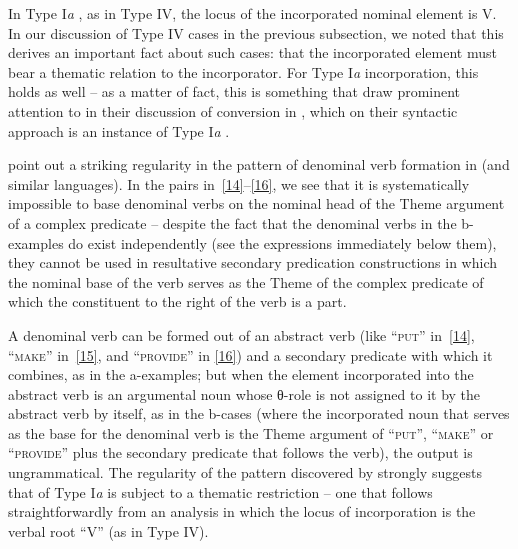 \documentclass[output=paper]{langsci/langscibook}
\begin{document}
\begin{refcontext}
In Type I\emph{a} , as in Type IV, the locus of the
incorporated nominal element is V. In our discussion of Type IV cases in the
previous subsection, we noted that this derives an important fact about such
cases: that the incorporated element must bear a thematic relation to the
incorporator. For Type I\emph{a} incorporation, this holds as well -- as a
matter of fact, this is something that \cite{halekeyser} draw prominent
attention to in their discussion of conversion in , which on their
syntactic approach is an instance of Type I\emph{a} .

\cite{halekeyser} point out a striking regularity in the pattern of denominal
verb formation in  (and similar languages). In the pairs
in~\eqref{14}--\eqref{16}, we see that it is systematically impossible to base
denominal verbs on the nominal head of the Theme argument of a complex
predicate -- despite the fact that the denominal verbs in the b-examples do
exist independently (see the expressions immediately below them), they cannot
be used in resultative secondary predication constructions in which the nominal
base of the verb serves as the Theme of the complex predicate of which the
constituent to the right of the verb is a part.

\ea \label{14}
    \z
\z

\ea \label{15}
    \z
\z

\ea \label{16}
    \z
\z
A denominal verb can be formed out of an abstract verb (like
\enquote{\textsc{put}} in~\eqref{14}, \enquote{\textsc{make}} in~\eqref{15},
and \enquote{\textsc{provide}} in \eqref{16}) and a secondary predicate with
which it combines, as in the a-examples; but when the element incorporated into
the abstract verb is an argumental noun whose θ{}-role is not assigned to it by
the abstract verb by itself, as in the b-cases (where the incorporated noun
that serves as the base for the denominal verb is the Theme argument of
\enquote{\textsc{put}}, \enquote{\textsc{make}} or \enquote{\textsc{provide}}
plus the secondary predicate that follows the verb), the output is
ungrammatical. The regularity of the pattern discovered by \cite{halekeyser}
strongly suggests that  of Type I\emph{a} is subject to a
thematic restriction -- one that follows straightforwardly from an analysis in
which the locus of incorporation is the verbal root \enquote{V} (as in Type
IV).


\end{refcontext}
\end{document}
